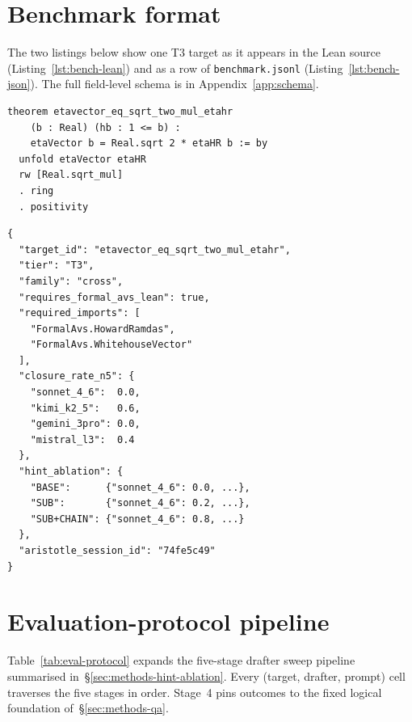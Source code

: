 \section{Benchmark format}
\label{app:bench-format-fig}

The two listings below show one T3 target as it appears in the Lean
source (Listing~\ref{lst:bench-lean}) and as a row of
\texttt{benchmark.jsonl} (Listing~\ref{lst:bench-json}). The full
field-level schema is in Appendix~\ref{app:schema}.

\begin{lstlisting}[style=leanstyle, caption={Lean theorem statement
  for the T3 target \texttt{etavector\_eq\_sqrt\_two\_mul\_etahr}.
  Stored verbatim in the \texttt{theorem\_statement} field of the
  matching JSONL row.},
  label={lst:bench-lean}]
theorem etavector_eq_sqrt_two_mul_etahr
    (b : Real) (hb : 1 <= b) :
    etaVector b = Real.sqrt 2 * etaHR b := by
  unfold etaVector etaHR
  rw [Real.sqrt_mul]
  . ring
  . positivity
\end{lstlisting}

\begin{lstlisting}[style=jsonstyle, caption={\texttt{benchmark.jsonl}
  record (excerpt) for the same target. The
  \texttt{hint\_ablation} block carries the three prompt columns
  for T3 targets only (Table~\ref{tab:hint-legend}).},
  label={lst:bench-json}]
{
  "target_id": "etavector_eq_sqrt_two_mul_etahr",
  "tier": "T3",
  "family": "cross",
  "requires_formal_avs_lean": true,
  "required_imports": [
    "FormalAvs.HowardRamdas",
    "FormalAvs.WhitehouseVector"
  ],
  "closure_rate_n5": {
    "sonnet_4_6":  0.0,
    "kimi_k2_5":   0.6,
    "gemini_3pro": 0.0,
    "mistral_l3":  0.4
  },
  "hint_ablation": {
    "BASE":      {"sonnet_4_6": 0.0, ...},
    "SUB":       {"sonnet_4_6": 0.2, ...},
    "SUB+CHAIN": {"sonnet_4_6": 0.8, ...}
  },
  "aristotle_session_id": "74fe5c49"
}
\end{lstlisting}

\section{Evaluation-protocol pipeline}
\label{app:eval-protocol-fig}

Table~\ref{tab:eval-protocol} expands the five-stage drafter sweep
pipeline summarised in~\S\ref{sec:methods-hint-ablation}. Every
(target, drafter, prompt) cell traverses the five stages in order.
Stage~4 pins outcomes to the fixed logical foundation
of~\S\ref{sec:methods-qa}.

